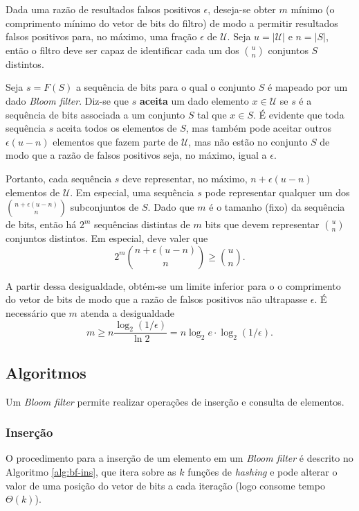\documentclass[12pt,twoside,english,brazilian]{article}
\begin{document}
Dada uma razão de resultados falsos positivos $\epsilon$, deseja-se obter $m$ mínimo (o comprimento mínimo do vetor de bits do filtro) de modo a permitir resultados falsos positivos para, no máximo, uma fração $\epsilon$ de $\mathcal{U}$. Seja $u = |\mathcal{U}|$ e $n = |S|$, então o filtro deve ser capaz de identificar cada um dos $\binom{u}{n}$ conjuntos $S$ distintos.

Seja $s = F(S)$ a sequência de bits para o qual o conjunto $S$ é mapeado por um dado \textit{Bloom filter}. Diz-se que $s$ \textbf{aceita} um dado elemento $x \in \mathcal{U}$ se $s$ é a sequência de bits associada a um conjunto $S$ tal que $x \in S$. É evidente que toda sequência $s$ aceita todos os elementos de $S$, mas também pode aceitar outros $\epsilon(u-n)$ elementos que fazem parte de $\mathcal{U}$, mas não estão no conjunto $S$ de modo que a razão de falsos positivos seja, no máximo, igual a $\epsilon$.

Portanto, cada sequência $s$ deve representar, no máximo, $n + \epsilon(u-n)$ elementos de $\mathcal{U}$. Em especial, uma sequência $s$ pode representar qualquer um dos $\binom{n + \epsilon(u - n)}{n}$ subconjuntos de $S$. Dado que $m$ é o tamanho (fixo) da sequência de bits, então há $2^m$ sequências distintas de $m$ bits que devem representar $\binom{u}{n}$ conjuntos distintos. Em especial, deve valer que $$2^m \binom{n + \epsilon(u - n)}{n} \geq \binom{u}{n}.$$

A partir dessa desigualdade, obtém-se um limite inferior para o o comprimento do vetor de bits de modo que a razão de falsos positivos não ultrapasse $\epsilon$. É necessário que $m$ atenda a desigualdade $$m \geq n \frac{\log_2(1/\epsilon)}{\ln 2} = n\log_2{e} \cdot \log_2{(1/\epsilon)}.$$

\subsection{Algoritmos}

Um \textit{Bloom filter} permite realizar operações de inserção e consulta de elementos.

\subsubsection{Inserção}

O procedimento para a inserção de um elemento em um \textit{Bloom filter} é descrito no Algoritmo \ref{alg:bf-ins}, que itera sobre as $k$ funções de \textit{hashing}  e pode alterar o valor de uma posição do vetor de bits a cada iteração (logo consome tempo $\Theta(k)$).
\end{document}
